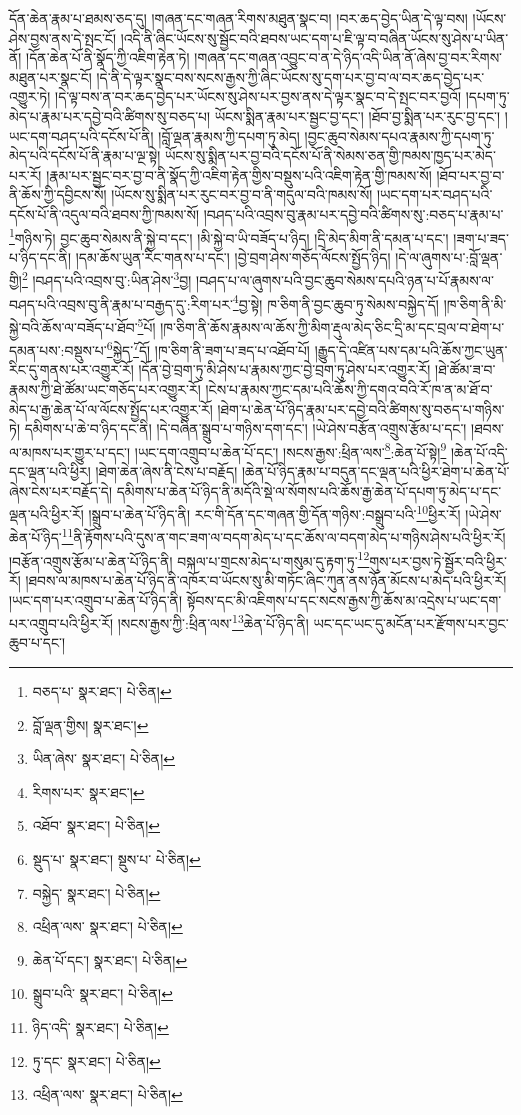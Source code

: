 དོན་ཆེན་རྣམ་པ་ཐམས་ཅད་དུ། །གཞན་དང་གཞན་རིགས་མཐུན་སྣང་བ། །བར་ཆད་བྱེད་ཡིན་དེ་ལྟ་བས། །ཡོངས་ཤེས་བྱས་ནས་དེ་སྤང་ངོ། །འདི་ནི་ཞིང་ཡོངས་སུ་སྦྱོང་བའི་ཐབས་ཡང་དག་པ་ཇི་ལྟ་བ་བཞིན་ཡོངས་སུ་ཤེས་པ་ཡིན་ནོ། །དོན་ཆེན་པོ་ནི་སྣོད་ཀྱི་འཇིག་རྟེན་ཏེ། །གཞན་དང་གཞན་འབྱུང་བ་ན་དེ་ཉིད་འདི་ཡིན་ནོ་ཞེས་བྱ་བར་རིགས་མཐུན་པར་སྣང་ངོ། །དེ་ནི་དེ་ལྟར་སྣང་བས་སངས་རྒྱས་ཀྱི་ཞིང་ཡོངས་སུ་དག་པར་བྱ་བ་ལ་བར་ཆད་བྱེད་པར་འགྱུར་ཏེ། །དེ་ལྟ་བས་ན་བར་ཆད་བྱེད་པར་ཡོངས་སུ་ཤེས་པར་བྱས་ནས་དེ་ལྟར་སྣང་བ་དེ་སྤང་བར་བྱའོ། །དཔག་ཏུ་མེད་པ་རྣམ་པར་དབྱེ་བའི་ཚིགས་སུ་བཅད་པ། ཡོངས་སྨིན་རྣམ་པར་སྦྱང་བྱ་དང་། །ཐོབ་བྱ་སྨིན་པར་རུང་བྱ་དང་། །ཡང་དག་བཤད་པའི་དངོས་པོ་ནི། །བློ་ལྡན་རྣམས་ཀྱི་དཔག་ཏུ་མེད། །བྱང་ཆུབ་སེམས་དཔའ་རྣམས་ཀྱི་དཔག་ཏུ་མེད་པའི་དངོས་པོ་ནི་རྣམ་པ་ལྔ་སྟེ། ཡོངས་སུ་སྨིན་པར་བྱ་བའི་དངོས་པོ་ནི་སེམས་ཅན་གྱི་ཁམས་ཁྱད་པར་མེད་པར་རོ། །རྣམ་པར་སྦྱང་བར་བྱ་བ་ནི་སྣོད་ཀྱི་འཇིག་རྟེན་གྱིས་བསྡུས་པའི་འཇིག་རྟེན་གྱི་ཁམས་སོ། །ཐོབ་པར་བྱ་བ་ནི་ཆོས་ཀྱི་དབྱིངས་སོ། །ཡོངས་སུ་སྨིན་པར་རུང་བར་བྱ་བ་ནི་གདུལ་བའི་ཁམས་སོ། །ཡང་དག་པར་བཤད་པའི་དངོས་པོ་ནི་འདུལ་བའི་ཐབས་ཀྱི་ཁམས་སོ། །བཤད་པའི་འབྲས་བུ་རྣམ་པར་དབྱེ་བའི་ཚིགས་སུ་:བཅད་པ་རྣམ་པ་\footnote{བཅད་པ་  སྣར་ཐང་།  པེ་ཅིན། }གཉིས་ཏེ། བྱང་ཆུབ་སེམས་ནི་སྐྱེ་བ་དང་། །མི་སྐྱེ་བ་ཡི་བཟོད་པ་ཉིད། །དྲི་མེད་མིག་ནི་དམན་པ་དང་། །ཟག་པ་ཟད་པ་ཉིད་དང་ནི། །དམ་ཆོས་ཡུན་རིང་གནས་པ་དང་། །བྱེ་བྲག་ཤེས་གཅོད་ལོངས་སྤྱོད་ཉིད། །དེ་ལ་ཞུགས་པ་:བློ་ལྡན་གྱི།\footnote{བློ་ལྡན་གྱིས།  སྣར་ཐང་། } །བཤད་པའི་འབྲས་བུ་:ཡིན་ཤེས་\footnote{ཡིན་ཞེས་  སྣར་ཐང་།  པེ་ཅིན། }བྱ། །བཤད་པ་ལ་ཞུགས་པའི་བྱང་ཆུབ་སེམས་དཔའི་ཉན་པ་པོ་རྣམས་ལ་བཤད་པའི་འབྲས་བུ་ནི་རྣམ་པ་བརྒྱད་དུ་:རིག་པར་\footnote{རིགས་པར་  སྣར་ཐང་། }བྱ་སྟེ། ཁ་ཅིག་ནི་བྱང་ཆུབ་ཏུ་སེམས་བསྐྱེད་དོ། །ཁ་ཅིག་ནི་མི་སྐྱེ་བའི་ཆོས་ལ་བཟོད་པ་ཐོབ་\footnote{འཐོབ་  སྣར་ཐང་།  པེ་ཅིན། }པོ། །ཁ་ཅིག་ནི་ཆོས་རྣམས་ལ་ཆོས་ཀྱི་མིག་རྡུལ་མེད་ཅིང་དྲི་མ་དང་བྲལ་བ་ཐེག་པ་དམན་པས་:བསྡུས་པ་\footnote{སྡུད་པ་  སྣར་ཐང་། སྡུས་པ་  པེ་ཅིན། }སྐྱེད་\footnote{བསྐྱེད་  སྣར་ཐང་།  པེ་ཅིན། }དོ། །ཁ་ཅིག་ནི་ཟག་པ་ཟད་པ་འཐོབ་པོ། །རྒྱུད་དེ་འཛིན་པས་དམ་པའི་ཆོས་ཀྱང་ཡུན་རིང་དུ་གནས་པར་འགྱུར་རོ། །དོན་བྱེ་བྲག་ཏུ་མི་ཤེས་པ་རྣམས་ཀྱང་བྱེ་བྲག་ཏུ་ཤེས་པར་འགྱུར་རོ། །ཐེ་ཚོམ་ཟ་བ་རྣམས་ཀྱི་ཐེ་ཚོམ་ཡང་གཅོད་པར་འགྱུར་རོ། །ངེས་པ་རྣམས་ཀྱང་དམ་པའི་ཆོས་ཀྱི་དགའ་བའི་རོ་ཁ་ན་མ་ཐོ་བ་མེད་པ་རྒྱ་ཆེན་པོ་ལ་ལོངས་སྤྱོད་པར་འགྱུར་རོ། །ཐེག་པ་ཆེན་པོ་ཉིད་རྣམ་པར་དབྱེ་བའི་ཚིགས་སུ་བཅད་པ་གཉིས་ཏེ། དམིགས་པ་ཆེ་བ་ཉིད་དང་ནི། །དེ་བཞིན་སྒྲུབ་པ་གཉིས་དག་དང་། །ཡེ་ཤེས་བརྩོན་འགྲུས་རྩོམ་པ་དང་། །ཐབས་ལ་མཁས་པར་གྱུར་པ་དང་། །ཡང་དག་འགྲུབ་པ་ཆེན་པོ་དང་། །སངས་རྒྱས་:ཕྲིན་ལས་\footnote{འཕྲིན་ལས་  སྣར་ཐང་།  པེ་ཅིན། }:ཆེན་པོ་སྟེ།\footnote{ཆེན་པོ་དང་།  སྣར་ཐང་།  པེ་ཅིན། } །ཆེན་པོ་འདི་དང་ལྡན་པའི་ཕྱིར། །ཐེག་ཆེན་ཞེས་ནི་ངེས་པ་བརྗོད། །ཆེན་པོ་ཉིད་རྣམ་པ་བདུན་དང་ལྡན་པའི་ཕྱིར་ཐེག་པ་ཆེན་པོ་ཞེས་ངེས་པར་བརྗོད་དེ། དམིགས་པ་ཆེན་པོ་ཉིད་ནི་མདོའི་སྡེ་ལ་སོགས་པའི་ཆོས་རྒྱ་ཆེན་པོ་དཔག་ཏུ་མེད་པ་དང་ལྡན་པའི་ཕྱིར་རོ། །སྒྲུབ་པ་ཆེན་པོ་ཉིད་ནི། རང་གི་དོན་དང་གཞན་གྱི་དོན་གཉིས་:བསྒྲུབ་པའི་\footnote{སྒྲུབ་པའི་  སྣར་ཐང་།  པེ་ཅིན། }ཕྱིར་རོ། །ཡེ་ཤེས་ཆེན་པོ་ཉིད་\footnote{ཉིད་འདི་  སྣར་ཐང་།  པེ་ཅིན། }ནི་རྟོགས་པའི་དུས་ན་གང་ཟག་ལ་བདག་མེད་པ་དང་ཆོས་ལ་བདག་མེད་པ་གཉིས་ཤེས་པའི་ཕྱིར་རོ། །བརྩོན་འགྲུས་རྩོམ་པ་ཆེན་པོ་ཉིད་ནི། བསྐལ་པ་གྲངས་མེད་པ་གསུམ་དུ་རྟག་ཏུ་\footnote{ཏུ་དང་  སྣར་ཐང་།  པེ་ཅིན། }གུས་པར་བྱས་ཏེ་སྦྱོར་བའི་ཕྱིར་རོ། །ཐབས་ལ་མཁས་པ་ཆེན་པོ་ཉིད་ནི་འཁོར་བ་ཡོངས་སུ་མི་གཏོང་ཞིང་ཀུན་ནས་ཉོན་མོངས་པ་མེད་པའི་ཕྱིར་རོ། །ཡང་དག་པར་འགྲུབ་པ་ཆེན་པོ་ཉིད་ནི། སྟོབས་དང་མི་འཇིགས་པ་དང་སངས་རྒྱས་ཀྱི་ཆོས་མ་འདྲེས་པ་ཡང་དག་པར་འགྲུབ་པའི་ཕྱིར་རོ། །སངས་རྒྱས་ཀྱི་:ཕྲིན་ལས་\footnote{འཕྲིན་ལས་  སྣར་ཐང་།  པེ་ཅིན། }ཆེན་པོ་ཉིད་ནི། ཡང་དང་ཡང་དུ་མངོན་པར་རྫོགས་པར་བྱང་ཆུབ་པ་དང་། 